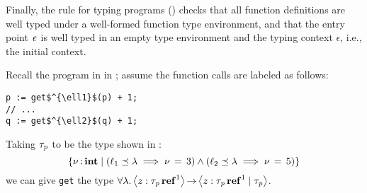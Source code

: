 Finally, the rule for typing programs () checks that
all function definitions are well typed under a well-formed
function type environment, and that the entry point $\mathit{e}$
is well typed in an empty type environment and the typing context
$ \epsilon $, i.e., the initial context.

\begin{example}[1-CFA]
  \label{exmp:1cfa}
  Recall the program in  in ; assume
  the function calls are labeled as follows:
\begin{lstlisting}
p := get$^{\ell1}$(p) + 1;
// ...
q := get$^{\ell2}$(q) + 1;
\end{lstlisting}
  Taking $\tau_{\mathit{p}}$ to be the type shown in :
  \[
     \left\{{  \nu  \operatorname{:} \mathbf{int} \mid   (    \ell_{{\mathrm{1}}}     \preceq    \lambda   \implies  \nu \, = \, 3  )  \wedge  (    \ell_{{\mathrm{2}}}     \preceq    \lambda   \implies  \nu \, = \, 5  )  }\right\} 
  \]
  we can give \lstinline{get} the type $ \forall  \lambda .\left\langle{ \mathit{z}  :   \tau_{\mathit{p}}  \operatorname{\mathbf{ref}}^{ 1 }  }\right\rangle\operatorname{\rightarrow}\left\langle{ \mathit{z}  :   \tau_{\mathit{p}}  \operatorname{\mathbf{ref}}^{ 1 }  \mid \tau_{\mathit{p}} }\right\rangle $.
\end{example}
